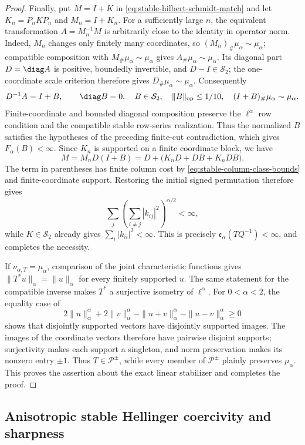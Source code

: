 \begin{proof}
Finally, put \(M=I+K\) in
\eqref{eq:stable-hilbert-schmidt-match} and let
\(K_n=P_nKP_n\) and \(M_n=I+K_n\).
For a sufficiently large \(n\), the equivalent transformation
\(A=M_n^{-1}M\) is arbitrarily close to the identity in operator norm.
Indeed, \(M_n\) changes only finitely many coordinates, so
\((M_n)_\#\mu_\alpha\sim\mu_\alpha\); compatible composition with
\(M_\#\mu_\alpha\sim\mu_\alpha\) gives
\(A_\#\mu_\alpha\sim\mu_\alpha\).
Its diagonal part \(D=\diag A\) is positive, boundedly invertible, and
\(D-I\in\mathcal S_2\); the one-coordinate scale criterion therefore gives
\(D_\#\mu_\alpha\sim\mu_\alpha\).
Consequently
\[
 D^{-1}A=I+B,
 \qquad
 \diag B=0,\quad B\in\mathcal S_2,\quad
 \|B\|_{\mathrm{op}}\le1/10,\quad
 (I+B)_\#\mu_\alpha\sim\mu_\alpha.
\]
Finite-coordinate and bounded diagonal composition preserve the
\(\ell^\alpha\) row condition and the compatible stable row-series
realization.  Thus the normalized \(B\) satisfies the hypotheses of the
preceding finite-cut contradiction, which gives \(F_\alpha(B)<\infty\).
Since \(K_n\) is supported on a finite coordinate block, we have
\[
 M=M_nD(I+B)
  =D+\bigl(K_nD+DB+K_nDB\bigr).
\]
The term in parentheses has finite column cost by
\eqref{eq:stable-column-class-bounds} and finite-coordinate support.
Restoring the initial signed permutation therefore gives
\[
 \sum_j\left(\sum_{i\ne j}|k_{ij}|^2\right)^{\alpha/2}<\infty,
\]
while \(K\in\mathcal S_2\) already gives
\(\sum_i|k_{ii}|^2<\infty\).
This is precisely \(\mathfrak e_\alpha(TQ^{-1})<\infty\), and completes
the necessity.

If \(\nu_{\alpha,T}=\mu_\alpha\), comparison of the joint characteristic
functions gives
\(\|T^*u\|_\alpha=\|u\|_\alpha\) for every finitely supported \(u\).
The same statement for the compatible inverse makes \(T^*\) a surjective
isometry of \(\ell^\alpha\).
For \(0<\alpha<2\), the equality case of
\[
 2\|u\|_\alpha^\alpha+2\|v\|_\alpha^\alpha
 -\|u+v\|_\alpha^\alpha-\|u-v\|_\alpha^\alpha\ge0
\]
shows that disjointly supported vectors have disjointly supported images.
The images of the coordinate vectors therefore have pairwise disjoint
supports; surjectivity makes each support a singleton, and norm preservation
makes its nonzero entry \(\pm1\).
Thus \(T\in\mathcal P^{\pm}\), while every member of \(\mathcal P^{\pm}\) plainly
preserves \(\mu_\alpha\).  This proves the assertion about the exact linear
stabilizer and completes the proof.
\end{proof}

\subsection{Anisotropic stable Hellinger coercivity and sharpness}
\label{sec:anisotropic-stable-hellinger-coercivity-and-sharpness}


